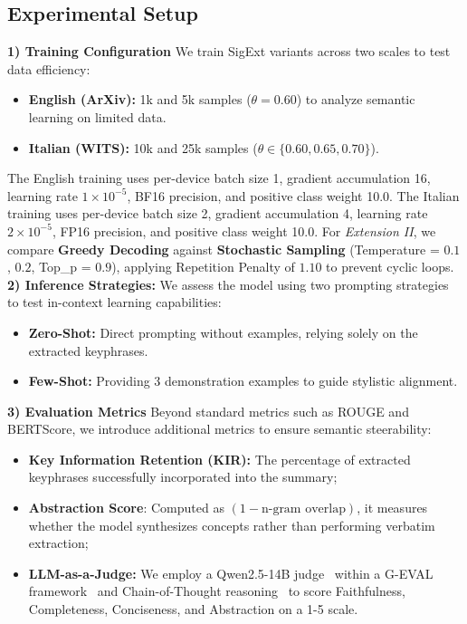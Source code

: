 \documentclass[conference]{IEEEtran}
\begin{document}
\subsection{Experimental Setup} \label{sec:exp_config}
\textbf{1) Training Configuration} 
We train SigExt variants across two scales to test data efficiency:
\begin{itemize}
    \item \textbf{English (ArXiv):} 1k and 5k samples ($\theta=0.60$) to analyze semantic learning on limited data.
    \item \textbf{Italian (WITS):} 10k and 25k samples ($\theta \in \{0.60, 0.65, 0.70\}$).
\end{itemize}
 The English training uses per-device batch size 1, gradient accumulation 16, learning rate $1 \times 10^{-5}$, BF16 precision, and positive class weight 10.0. The Italian training uses per-device batch size 2, gradient accumulation 4, learning rate $2 \times 10^{-5}$, FP16 precision, and positive class weight 10.0. For \textit{Extension II}, we compare \textbf{Greedy Decoding} against \textbf{Stochastic Sampling} (Temperature = $0.1$, $0.2$, Top\_p = $0.9$), applying Repetition Penalty of $1.10$ to prevent cyclic loops.\\
 \textbf{2) Inference Strategies:} We assess the model using two prompting strategies to test in-context learning capabilities:
\begin{itemize}
    \item \textbf{Zero-Shot:} Direct prompting without examples, relying solely on the extracted keyphrases.
    \item \textbf{Few-Shot:} Providing 3 demonstration examples to guide stylistic alignment.
\end{itemize}
 \textbf{3) Evaluation Metrics} Beyond standard metrics such as ROUGE and BERTScore, we introduce additional metrics to ensure semantic steerability: 
 \begin{itemize}
     \item \textbf{Key Information Retention (KIR):} The percentage of extracted keyphrases successfully incorporated into the summary;
    \item  \textbf{Abstraction Score}: Computed as $(1 - \text{n-gram overlap})$, it measures whether the model synthesizes concepts rather than performing verbatim extraction;
    \item \textbf{LLM-as-a-Judge:} We employ a Qwen2.5-14B judge~\cite{goyal2023newssummarizationevaluationera} within a G-EVAL framework~\cite{liu-etal-2023-g-eval} and Chain-of-Thought reasoning~\cite{saha2025learning} to score Faithfulness, Completeness, Conciseness, and Abstraction on a 1-5 scale.
 \end{itemize}
\end{document}
